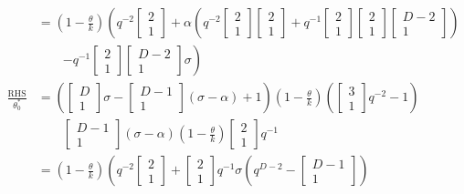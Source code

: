 \documentclass[
]{book}
\theoremstyle{definition}
\theoremstyle{definition}
\theoremstyle{definition}
\theoremstyle{definition}
\theoremstyle{remark}
\begin{document}
\begin{align}
& = \left(1-\frac{\theta}{k}\right)\left(q^{-2}\begin{bmatrix}{2}\\{1}\end{bmatrix}+\alpha\left(q^{-2}\begin{bmatrix}{2}\\{1}\end{bmatrix}\begin{bmatrix}{2}\\{1}\end{bmatrix}+q^{-1}\begin{bmatrix}{2}\\{1}\end{bmatrix}\begin{bmatrix}{2}\\{1}\end{bmatrix}\begin{bmatrix}{D-2}\\{1}\end{bmatrix}\right)\right.\\
& \qquad \left.-q^{-1}\begin{bmatrix}{2}\\{1}\end{bmatrix}\begin{bmatrix}{D-2}\\{1}\end{bmatrix}\sigma\right)\\
\frac{\mathrm{RHS}}{\theta^*_0} & = \left(\begin{bmatrix}{D}\\{1}\end{bmatrix}\sigma-\begin{bmatrix}{D-1}\\{1}\end{bmatrix}(\sigma-\alpha)+1\right)\left(1-\frac{\theta}{k}\right)\left(\begin{bmatrix}{3}\\{1}\end{bmatrix}q^{-2}-1\right)\\
& \qquad \begin{bmatrix}{D-1}\\{1}\end{bmatrix}(\sigma-\alpha)\left(1-\frac{\theta}{k}\right)\begin{bmatrix}{2}\\{1}\end{bmatrix}q^{-1}\\
& = \left(1-\frac{\theta}{k}\right)\left(q^{-2}\begin{bmatrix}{2}\\{1}\end{bmatrix}+\begin{bmatrix}{2}\\{1}\end{bmatrix}q^{-1}\sigma\left(q^{D-2}-\begin{bmatrix}{D-1}\\{1}\end{bmatrix}\right)\right.\\

\end{align}
\end{document}
